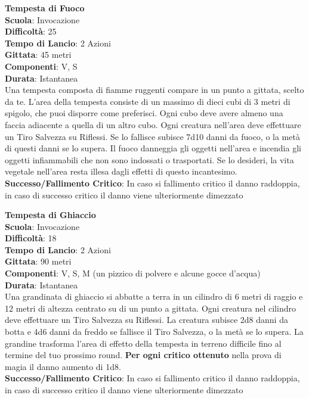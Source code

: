 \begin{multicols}{2}
\medskip\textbf{Tempesta di Fuoco}\\
\textbf{Scuola}: Invocazione\\
\textbf{Difficoltà}: 25\\
\textbf{Tempo di Lancio}: 2 Azioni\\
\textbf{Gittata}: 45 metri\\
\textbf{Componenti}: V, S\\
\textbf{Durata}: Istantanea\\
Una tempesta composta di fiamme ruggenti compare in un punto a gittata, scelto da te. L'area della tempesta consiste di un massimo di dieci cubi di 3 metri di spigolo, che puoi disporre come preferisci. Ogni cubo deve avere almeno una faccia adiacente a quella di un altro cubo. Ogni creatura nell'area deve effettuare un Tiro Salvezza su Riflessi. Se lo fallisce subisce 7d10 danni da fuoco, o la metà di questi danni se lo supera. Il fuoco danneggia gli oggetti nell'area e incendia gli oggetti infiammabili che non sono indossati o trasportati. Se lo desideri, la vita vegetale nell'area resta illesa dagli effetti di questo incantesimo. \\
\textbf{Successo/Fallimento Critico}: In caso si fallimento critico il danno raddoppia, in caso di successo critico il danno viene ulteriormente dimezzato

\medskip\textbf{Tempesta di Ghiaccio}\\
\textbf{Scuola}: Invocazione\\
\textbf{Difficoltà}: 18\\
\textbf{Tempo di Lancio}: 2 Azioni\\
\textbf{Gittata}: 90 metri\\
\textbf{Componenti}: V, S, M (un pizzico di polvere e alcune gocce d'acqua)\\
\textbf{Durata}: Istantanea\\
Una grandinata di ghiaccio si abbatte a terra in un cilindro di 6 metri di raggio e 12 metri di altezza centrato su di un punto a gittata. Ogni creatura nel cilindro deve effettuare un Tiro Salvezza su Riflessi. La creatura subisce 2d8 danni da botta e 4d6 danni da freddo se fallisce il Tiro Salvezza, o la metà se lo supera. La grandine trasforma l'area di effetto della tempesta in terreno difficile fino al termine del tuo prossimo round.
\textbf{Per ogni critico ottenuto} nella prova di magia il danno aumento di 1d8.\\
\textbf{Successo/Fallimento Critico}: In caso si fallimento critico il danno raddoppia, in caso di successo critico il danno viene ulteriormente dimezzato


\end{multicols}
